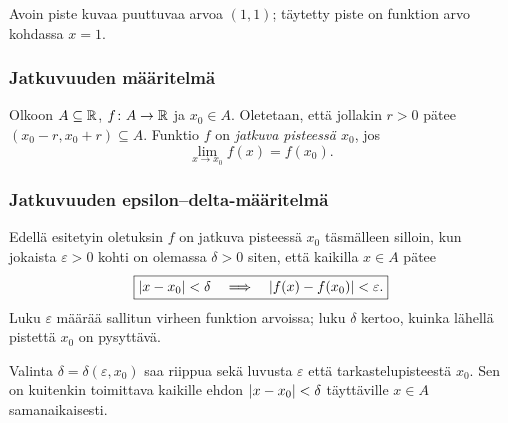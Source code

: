 \documentclass[11pt,a4paper]{amsart}
\begin{document}
\begin{center}

  \small Avoin piste kuvaa puuttuvaa arvoa $(1,1)$;
  täytetty piste on funktion arvo kohdassa $x=1$.
\end{center}

\subsubsection*{Jatkuvuuden määritelmä}

\begin{definition}
  Olkoon $A\subseteq\mathbb{R}$, $f\colon A\to\mathbb{R}$ ja $x_0\in A$.
  Oletetaan, että jollakin $r>0$ pätee
  $(x_0-r,x_0+r)\subseteq A$.
  Funktio $f$ on \emph{jatkuva pisteessä $x_0$}, jos
  \[
    \boxed{\lim_{x\to x_0}f(x)=f(x_0).}
  \]
\end{definition}

\subsubsection*{Jatkuvuuden epsilon--delta-määritelmä}

Edellä esitetyin oletuksin $f$ on jatkuva pisteessä $x_0$ täsmälleen
silloin, kun jokaista $\varepsilon>0$ kohti on olemassa $\delta>0$
siten, että kaikilla $x\in A$ pätee
\[
  \boxed{\lvert x-x_0\rvert<\delta
    \quad\Longrightarrow\quad
  \lvert f(x)-f(x_0)\rvert<\varepsilon.}
\]
Luku $\varepsilon$ määrää sallitun virheen funktion arvoissa;
luku $\delta$ kertoo, kuinka lähellä pistettä $x_0$ on pysyttävä.

\begin{remark}
  Valinta $\delta=\delta(\varepsilon,x_0)$ saa riippua sekä
  luvusta $\varepsilon$ että tarkastelupisteestä $x_0$.
  Sen on kuitenkin toimittava kaikille ehdon $\lvert x-x_0\rvert<\delta$
  täyttäville $x\in A$ samanaikaisesti.
\end{remark}
\end{document}
